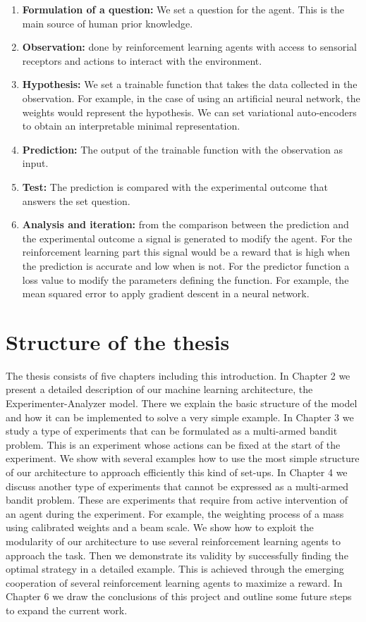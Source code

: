 \documentclass[11pt,a4paper,twoside]{report}
\newcommand{\+}{\textnormal{+} }
\theoremstyle{definition}
\numberwithin{equation}{chapter}
\begin{document}
\begin{enumerate}
  \item \textbf{Formulation of a question:} We set a question for the agent.
  This is the main source of human prior knowledge.
  \item \textbf{Observation:} done by reinforcement learning agents with access
  to sensorial receptors and actions to interact with the environment.
  \item  \textbf{Hypothesis:} We set a trainable function that takes the data
  collected in the observation. For example, in the case of using an artificial
  neural network, the weights would represent the hypothesis. We can set
  variational auto-encoders to obtain an interpretable minimal representation.
  \item \textbf{Prediction:} The output of the trainable function with the
  observation as input.
  \item \textbf{Test:} The prediction is compared with the experimental outcome
  that answers the set question.
  \item \textbf{Analysis and iteration:} from the comparison between the
  prediction and the experimental outcome a signal is generated to modify the
  agent. For the reinforcement learning part this signal would be a reward that
  is high when the prediction is accurate and low when is not. For the predictor
  function a loss value to modify the parameters defining the function. For
  example, the mean squared error to apply gradient descent in a neural network.
\end{enumerate}

\section{Structure of the thesis}

The thesis consists of five chapters including this introduction. In Chapter 2
we present a detailed description of our machine learning architecture, the
Experimenter-Analyzer model. There we explain the basic structure of the model
and how it can be implemented to solve a very simple example. In Chapter 3 we
study a type of experiments that can be formulated as a multi-armed bandit
problem. This is an experiment whose actions can be fixed at the start of the
experiment. We show with several examples how to use the most simple structure
of our architecture to approach efficiently this kind of set-ups. In Chapter 4
we discuss another type of experiments that cannot be expressed as a multi-armed
bandit problem. These are experiments that require from active intervention of
an agent during the experiment. For example, the weighting process of a mass
using calibrated weights and a beam scale. We show how to exploit the modularity
of our architecture to use several reinforcement learning agents to approach the
task. Then we demonstrate its validity by successfully finding the optimal
strategy in a detailed example. This is achieved through the emerging
cooperation of several reinforcement learning agents to maximize a reward. In
Chapter 6 we draw the conclusions of this project and outline some future steps
to expand the current work.
\end{document}
